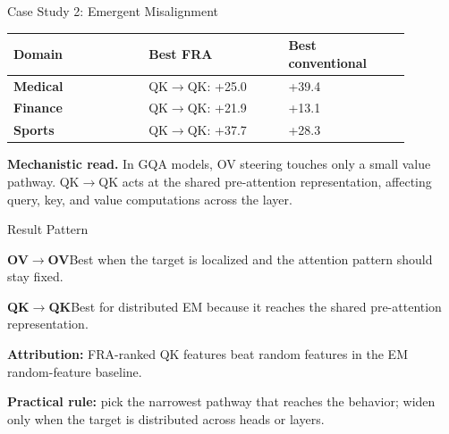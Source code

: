 \begin{minipage}[t][\dimexpr\textheight-7.20in\relax][t]{0.663\textwidth}
\begin{minipage}[t]{0.486\linewidth}
\begin{posterbox}[height=22.75in, colframe=caseEmC!75, top=0.42in, attach boxed title to top left={xshift=0.16in,yshift=-0.30in}]{Case Study 2: \textcolor{caseEmC}{Emergent Misalignment}}
\vspace{0.18in}
\begin{tabular}{>{\bfseries}p{0.30\linewidth}p{0.31\linewidth}p{0.27\linewidth}}
\toprule
Domain & Best FRA & Best conventional \\
\midrule
Medical & QK$\to$QK: +25.0 & +39.4 \\
Finance & QK$\to$QK: +21.9 & +13.1 \\
Sports & QK$\to$QK: +37.7 & +28.3 \\
\bottomrule
\end{tabular}

\vfill
\begin{tcolorbox}[sharp corners, boxrule=0.8pt, colframe=caseEmC, colback=caseEmFill]
\textbf{Mechanistic read.} In GQA models, OV steering touches only a small value pathway. QK$\to$QK acts at the shared pre-attention representation, affecting query, key, and value computations across the layer.
\end{tcolorbox}
\end{posterbox}

\end{minipage}

\vspace{0.66in}
\begin{posterbox}[height=3.4in, colframe=ink, top=0.30in, bottom=0.16in]{Result Pattern}
\begin{minipage}[t][2.5in][t]{\linewidth}
{\fontsize{36}{43}\selectfont
  \begin{minipage}[t]{0.486\linewidth}
    \textbf{OV$\to$OV}\quad Best when the target is localized and the attention pattern should stay fixed.
  \end{minipage}\hfill
  \begin{minipage}[t]{0.486\linewidth}
    \textbf{QK$\to$QK}\quad Best for distributed EM because it reaches the shared pre-attention representation.
  \end{minipage}\par}

\vfill
{\fontsize{34}{41}\selectfont
  \begin{minipage}[t]{0.486\linewidth}
    \textbf{Attribution:} FRA-ranked QK features beat random features in the EM random-feature baseline.
  \end{minipage}\hfill
  \begin{minipage}[t]{0.486\linewidth}
    \textbf{Practical rule:} pick the narrowest pathway that reaches the behavior; widen only when the target is distributed across heads or layers.
  \end{minipage}\par}
\end{minipage}
\end{posterbox}

\end{minipage}

